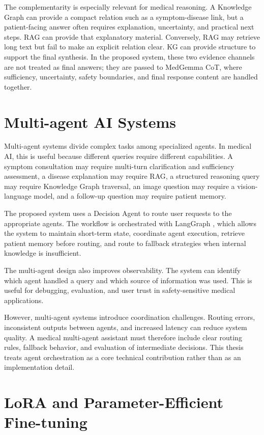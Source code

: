 The complementarity is especially relevant for medical reasoning. A Knowledge Graph can provide a compact relation such as a symptom-disease link, but a patient-facing answer often requires explanation, uncertainty, and practical next steps. RAG can provide that explanatory material. Conversely, RAG may retrieve long text but fail to make an explicit relation clear. KG can provide structure to support the final synthesis. In the proposed system, these two evidence channels are not treated as final answers; they are passed to MedGemma CoT, where sufficiency, uncertainty, safety boundaries, and final response content are handled together.

\section{Multi-agent AI Systems}

Multi-agent systems divide complex tasks among specialized agents. In medical AI, this is useful because different queries require different capabilities. A symptom consultation may require multi-turn clarification and sufficiency assessment, a disease explanation may require RAG, a structured reasoning query may require Knowledge Graph traversal, an image question may require a vision-language model, and a follow-up question may require patient memory.

The proposed system uses a Decision Agent to route user requests to the appropriate agents. The workflow is orchestrated with LangGraph \cite{langgraph_doc}, which allows the system to maintain short-term state, coordinate agent execution, retrieve patient memory before routing, and route to fallback strategies when internal knowledge is insufficient.

The multi-agent design also improves observability. The system can identify which agent handled a query and which source of information was used. This is useful for debugging, evaluation, and user trust in safety-sensitive medical applications.

However, multi-agent systems introduce coordination challenges. Routing errors, inconsistent outputs between agents, and increased latency can reduce system quality. A medical multi-agent assistant must therefore include clear routing rules, fallback behavior, and evaluation of intermediate decisions. This thesis treats agent orchestration as a core technical contribution rather than as an implementation detail.

\section{LoRA and Parameter-Efficient Fine-tuning}

